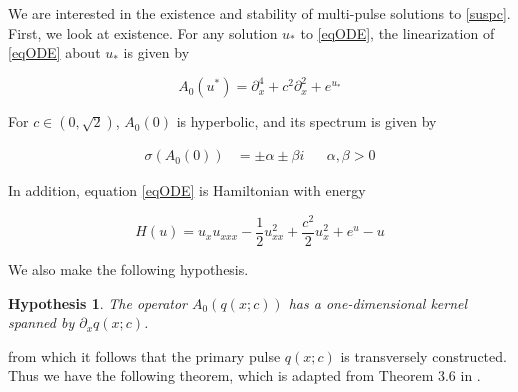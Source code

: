 \documentclass[12pt]{article}
\newtheorem{hypothesis}{Hypothesis}
\begin{document}
We are interested in the existence and stability of multi-pulse solutions to \eqref{suspc}. First, we look at existence. For any solution $u_*$ to \eqref{eqODE}, the linearization of \eqref{eqODE} about $u_*$ is given by

\begin{equation}\label{defA0}
A_0(u^*) = \partial_x^4 + c^2 \partial_x^2 + e^{u_*}
\end{equation}

For $c \in (0, \sqrt{2})$, $A_0(0)$ is hyperbolic, and its spectrum is given by

\begin{align}\label{specA00}
\sigma(A_0(0)) &= \pm \alpha \pm \beta i && \alpha, \beta > 0
\end{align}

In addition, equation \eqref{eqODE} is Hamiltonian with energy

\begin{equation}\label{defH}
H(u) = u_x u_{xxx} - \frac{1}{2}u_{xx}^2 + \frac{c^2}{2}u_x^2 + e^u - u
\end{equation}

We also make the following hypothesis.

\begin{hypothesis}\label{A0kernel}
The operator $A_0(q(x; c))$ has a one-dimensional kernel spanned by $\partial_x q(x; c)$.
\end{hypothesis}

from which it follows that the primary pulse $q(x; c)$ is transversely constructed. Thus we have the following theorem, which is adapted from Theorem 3.6 in \cite{Sandstede1997}.
\end{document}
